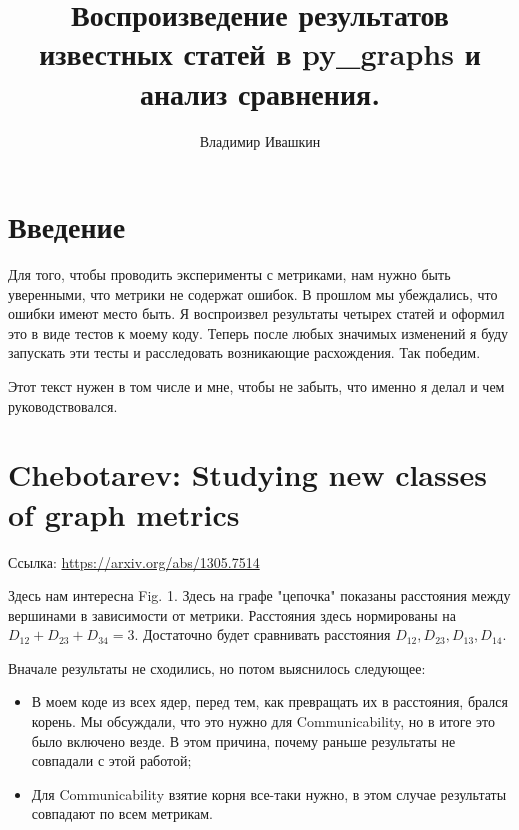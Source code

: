 \documentclass{article}
\title{
        Воспроизведение результатов известных статей в py\_graphs и анализ сравнения.
}
\author{Владимир Ивашкин}
\begin{document}
\maketitle


\section*{Введение}
Для того, чтобы проводить эксперименты с метриками, нам нужно быть уверенными, что метрики не содержат ошибок. В прошлом мы убеждались, что ошибки имеют место быть.
Я воспроизвел результаты четырех статей и оформил это в виде тестов к моему коду. Теперь после любых значимых изменений я буду запускать эти тесты и расследовать возникающие расхождения. Так победим.

Этот текст нужен в том числе и мне, чтобы не забыть, что именно я делал и чем руководствовался.


\section{Chebotarev: Studying new classes of graph metrics}
Ссылка: \url{https://arxiv.org/abs/1305.7514}

Здесь нам интересна Fig. 1. Здесь на графе "цепочка" показаны расстояния между вершинами в зависимости от метрики. Расстояния здесь нормированы на $D_{12} + D_{23} + D_{34} = 3$.
Достаточно будет сравнивать расстояния $D_{12}, D_{23}, D_{13}, D_{14}$.

Вначале результаты не сходились, но потом выяснилось следующее:
\begin{itemize}
  \item В моем коде из всех ядер, перед тем, как превращать их в расстояния, брался корень. Мы обсуждали, что это нужно для Communicability, но в итоге это было включено везде. В этом причина, почему раньше результаты не совпадали с этой работой;
  \item Для Communicability взятие корня все-таки нужно, в этом случае результаты совпадают по всем метрикам.
\end{itemize}
\end{document}
